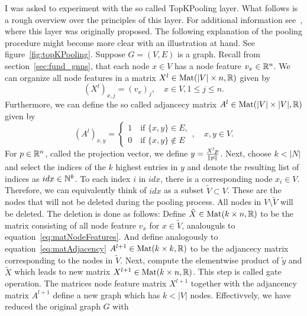 \label{sec:implPercolation}
I was asked to experiment with the so called TopKPooling layer. What follows 
is a rough overview over the principles of this layer. 
For additional information see~\cite{topKPooling}, where this layer was originally proposed.
The following explanation of the pooling procedure might become more clear with
an illustration at hand. See figure~\ref{fig:topKPooling}.
Suppose $G=(V,E)$ is a graph. Recall from section~\ref{sec:fund_gnns}, 
that each node $x\in V$ has a node feature $v_x\in\mathbb{R}^n$. We can organize all node
features in a matrix $X^l\in\text{Mat}(|V|\times n,\mathbb{R})$ given by
\begin{equation*}
    \left(X^l\right)_{x,j}=\left(v_x\right)_j, \quad x\in V, 1\leq j \leq n.
    \label{eq:matNodeFeatures}
\end{equation*}
Furthermore, we can define the so called adjancecy matrix $A^l\in\text{Mat}(|V|\times |V|,\mathbb{R})$ given by
\begin{equation*}
    \left(A^l\right)_{x,y}=\begin{cases}
        1 \quad \text{if } \{x,y\}\in E,\\
        0 \quad \text{if } \{x,y\}\notin E
    \end{cases}, \quad x,y\in V.
    \label{eq:matAdjacency}
\end{equation*}
For $p\in\mathbb{R}^n$, called the projection vector, we define $y=\frac{X^l p}{\lVert p\rVert}$. 
Next, choose $k<|N|$ and select the indices of the $k$ highest entries in $y$ and denote the resulting 
list of indices as $idx\in\mathbb{N}^k$. To each index $i$ in $idx$, there is a corresponding 
node $x_i\in V$. Therefore, we can equivalently think of $idx$ as a subset $\tilde{V}\subset V$. 
These are the nodes that will not be deleted during the pooling process. 
All nodes in $V\setminus\tilde{V}$ will be deleted. 
The deletion is done as follows: Define $\tilde{X}\in\text{Mat}(k\times n,\mathbb{R})$ to be the matrix
consisting of all node feature $v_x$ for $x\in\tilde{V}$, analouguls to equation~\ref{eq:matNodeFeatures}. 
And define analogously to equation~\ref{eq:matAdjacency} $A^{l+1}\in\text{Mat}(k\times k,\mathbb{R})$ 
to be the adjancecy matrix corresponding to the nodes in $\tilde{V}$.
Next, compute the elementwise product of $\tilde{y}$ and $\tilde{X}$ which leads to new matrix
$X^{l+1}\in\text{Mat}(k\times n,\mathbb{R})$. This step is called \glqq{}gate operation\grqq{}.
The matrices node feature matrix $X^{l+1}$ together with the adjancency matrix $A^{l+1}$
define a new graph which has $k<|V|$ nodes. Effectivvely, we have reduced the original graph $G$ with

